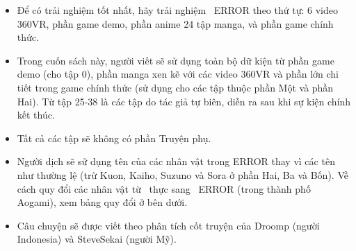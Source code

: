 \documentclass[main.tex]{subfiles}
\begin{document}
\begin{itemize}
    \item Để có trải nghiệm tốt nhất, hãy trải nghiệm \hll\ ERROR theo thứ tự: 6 video 360VR, phần game demo, phần anime 24 tập manga, và phần game chính thức.
    \item Trong cuốn sách này, người viết sẽ sử dụng toàn bộ dữ kiện từ phần game demo (cho tập 0), phần manga xen kẽ với các video 360VR và phần lớn chi tiết trong game chính thức (sử dụng cho các tập thuộc phần Một và phần Hai). Từ tập 25-38 là các tập do tác giả tự biên, diễn ra sau khi sự kiện chính kết thúc.
    \item  Tất cả các tập sẽ không có phần {\abv Truyện phụ}.
    \item Người dịch sẽ sử dụng tên của các nhân vật trong ERROR thay vì các tên như thường lệ (trừ Kuon, Kaiho, Suzuno và Sora ở phần Hai, Ba và Bốn). Về cách quy đổi các nhân vật từ \hll\ thực sang \hll\ ERROR (trong thành phố Aogami), xem bảng quy đổi ở bên dưới.
    \item Câu chuyện sẽ được viết theo phân tích cốt truyện của Droomp (người Indonesia) và SteveSekai (người Mỹ).
\end{itemize}
\end{document}
